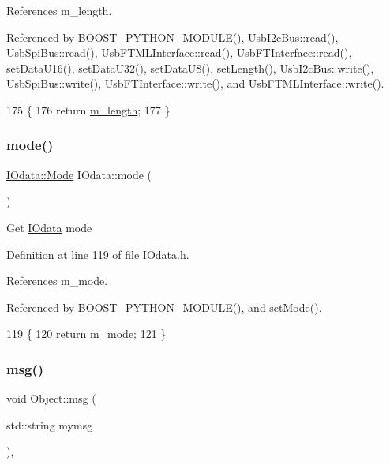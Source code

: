 References m\+\_\+length.



Referenced by B\+O\+O\+S\+T\+\_\+\+P\+Y\+T\+H\+O\+N\+\_\+\+M\+O\+D\+U\+L\+E(), Usb\+I2c\+Bus\+::read(), Usb\+Spi\+Bus\+::read(), Usb\+F\+T\+M\+L\+Interface\+::read(), Usb\+F\+T\+Interface\+::read(), set\+Data\+U16(), set\+Data\+U32(), set\+Data\+U8(), set\+Length(), Usb\+I2c\+Bus\+::write(), Usb\+Spi\+Bus\+::write(), Usb\+F\+T\+Interface\+::write(), and Usb\+F\+T\+M\+L\+Interface\+::write().


\begin{DoxyCode}
175               \{
176     \textcolor{keywordflow}{return} \hyperlink{classIOdata_afabe57441da019eb614d277799106aac}{m\_length};
177   \}
\end{DoxyCode}
\mbox{\label{classIOdata_aae2073c3bc6bc9f620dc0fca7fccc9a7}} 
\subsubsection{\texorpdfstring{mode()}{mode()}}
{\footnotesize\ttfamily \hyperlink{classIOdata_a044e9a4a0c6d25a43ebfe29c4fa4f1e5}{I\+Odata\+::\+Mode} I\+Odata\+::mode (\begin{DoxyParamCaption}{ }\end{DoxyParamCaption})\hspace{0.3cm}{\ttfamily [inline]}}

Get \hyperlink{classIOdata}{I\+Odata} mode 

Definition at line 119 of file I\+Odata.\+h.



References m\+\_\+mode.



Referenced by B\+O\+O\+S\+T\+\_\+\+P\+Y\+T\+H\+O\+N\+\_\+\+M\+O\+D\+U\+L\+E(), and set\+Mode().


\begin{DoxyCode}
119                    \{
120     \textcolor{keywordflow}{return} \hyperlink{classIOdata_a0782e31763fa855f1ecbd377dce538e6}{m\_mode};
121   \}
\end{DoxyCode}
\mbox{\label{classObject_a58b2d0618c2d08cf2383012611528d97}} 
\subsubsection{\texorpdfstring{msg()}{msg()}\hspace{0.1cm}{\footnotesize\ttfamily [1/2]}}
{\footnotesize\ttfamily void Object\+::msg (\begin{DoxyParamCaption}\item[{std\+::string}]{mymsg }\end{DoxyParamCaption})\hspace{0.3cm}{\ttfamily [inline]}, {\ttfamily [inherited]}}



